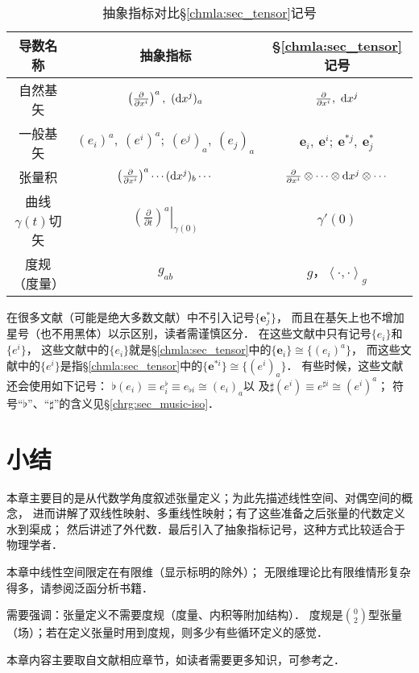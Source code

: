 \begin{table}[htb]
    \centering
    \caption{抽象指标对比\S\ref{chmla:sec_tensor}记号} \label{chmla:tab-aivscc}
    \begin{tabular}{|*3{c|}}
        \hline
        导数名称 & 抽象指标 & \S\ref{chmla:sec_tensor}记号 \\ 
        \hline
        自然基矢 & $\left(\frac{\partial}{\partial x^i} \right)^a,\  ({\rm d}x^j)_a$ 
                 & $\frac{\partial}{\partial x^i}, \  {\rm d}x^j$    \\ 
        \hline
        一般基矢 & $(e_i)^a,\ (e^i)^a;\ (e^j)_a,\ (e_j)_a$ &  $\boldsymbol{e}_i,\ \boldsymbol{e}^i;\ 
        \boldsymbol{e}^{*j},\  \boldsymbol{e}^{*}_{j} $    \\ 
        \hline
        张量积   & $\left(\frac{\partial}{\partial x^i} \right)^a \cdots ({\rm d}x^j)_b \cdots $ 
                   &  $\frac{\partial}{\partial x^i}\otimes \cdots\otimes
                   {\rm d}x^j \otimes \cdots$    \\ 
        \hline        
        曲线$\gamma(t)$切矢 & $\left.\left(\frac{\partial}{\partial t} \right)^a \right|_{\gamma(0)} $ 
          & $\gamma'(0)$  \\ 
        \hline
        度规（度量） & $g_{ab}$ & $g$，$\left<\cdot ,\cdot \right>_{g}$ \\ \hline
    \end{tabular}
\end{table}

\begin{remark}
	在很多文献（可能是绝大多数文献）中不引入记号$\{\boldsymbol{e}_j^{*}\}$，
	而且在基矢上也不增加星号（也不用黑体）以示区别，读者需谨慎区分．
	在这些文献中只有记号$\{{e}_i\}$和$\{{e}^{i}\}$，
	这些文献中的$\{{e}_i\}$就是\S\ref{chmla:sec_tensor}中的$\{\boldsymbol{e}_i\}\cong \{(e_i)^a\}$，
	而这些文献中的$\{{e}^{i}\}$是指\S\ref{chmla:sec_tensor}中的$\{\boldsymbol{e}^{*i}\}\cong \{(e^i)_a\}$．
	有些时候，这些文献还会使用如下记号：
	$\flat({e}_i) \equiv {e}_i^\flat \equiv {e}_{\flat i} \cong (e_i)_a$以
	及$\sharp({e}^{i}) \equiv {e}^{\sharp i} \cong (e^i)^a$；
	符号“$\flat$”、“$\sharp$”的含义见\S\ref{chrg:sec_music-iso}．
\end{remark}



\section*{小结}


本章主要目的是从代数学角度叙述张量定义；为此先描述线性空间、对偶空间的概念，
进而讲解了双线性映射、多重线性映射；有了这些准备之后张量的代数定义水到渠成；
然后讲述了外代数．最后引入了抽象指标记号，这种方式比较适合于物理学者．

本章中线性空间限定在有限维（显示标明的除外）；
无限维理论比有限维情形复杂得多，请参阅泛函分析书籍．

需要强调：张量定义不需要度规（度量、内积等附加结构）．
度规是$\binom{0}{2}$型张量（场）；若在定义张量时用到度规，则多少有些循环定义的感觉．

本章内容主要取自文献\parencite{qiuws-2019-v2}相应章节，如读者需要更多知识，可参考之．

\printbibliography[heading=subbibliography,title=第\ref{chmla}章参考文献]
\endinput


